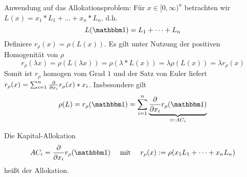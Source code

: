 Anwendung auf das Allokationsproblem: Für $x \in [0,\infty)^n$ betrachten wir $L(x) = x_1 * L_1 + \dots + x_n * L_n$, d.h. 
\begin{equation*}
	L(\one) = L_1 + \dots + L_n
\end{equation*}
Definiere $r_\rho(x) = \rho(L(x))$. Es gilt unter Nutzung der positiven Homogenität von $\rho$
\begin{equation*}
	r_\rho(\lambda x) = \rho(L(\lambda x)) = \rho(\lambda * L(x)) = \lambda \rho(L(x)) = \lambda r_\rho(x)
\end{equation*}
Somit ist $r_\rho$ homogen vom Grad $1$ und der Satz von Euler liefert $r_\rho(x) = \sum_{i=1}^n \frac{\partial}{\partial x_i } r_\rho(x) * x_i$. Insbesondere gilt
\begin{equation*}
	\rho(L) = r_\rho(\one) = \sum_{i=1}^n \underbrace{\partdiff{x_i} r_\rho(\one)}_{\defqe AC_i}
\end{equation*}

\begin{*definition}
	Die Kapital-Allokation 
	\begin{equation*}
		AC_i = \partdiff{x_i} r_\rho(\one) \quad \mit \quad r_\rho(x) \defeq \rho(x_1 L_1 + \dots + x_n L_n)
	\end{equation*}
	heißt  der Allokation.
\end{*definition}

